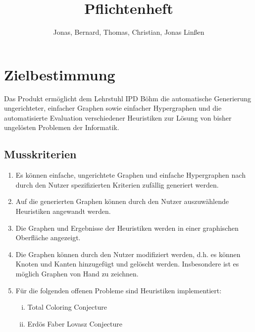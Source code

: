 \documentclass{article}
\title{Pflichtenheft}
\author{Jonas, Bernard, Thomas, Christian, Jonas Linßen}
\begin{document}
	\maketitle
	
	
	\newpage
	
	\tableofcontents
	
	\newpage
	
	
	\section{Zielbestimmung}
	Das Produkt ermöglicht dem Lehrstuhl IPD Böhm die automatische Generierung ungerichteter, einfacher Graphen sowie einfacher Hypergraphen und die automatisierte Evaluation verschiedener Heuristiken zur Lösung von bisher ungelösten Problemen der Informatik.
	
	\subsection{Musskriterien}
	\begin{enumerate}[(M1)]
		\item{Es können einfache, ungerichtete Graphen und einfache Hypergraphen nach durch den Nutzer spezifizierten Kriterien zufällig generiert werden.}
		\item{Auf die generierten Graphen können durch den Nutzer auszuwählende Heuristiken angewandt werden.}
		\item{Die Graphen und Ergebnisse der Heuristiken werden in einer graphischen Oberfläche angezeigt.}
		\item{Die Graphen können durch den Nutzer modifiziert werden, d.h. es können Knoten und Kanten hinzugefügt und gelöscht werden. Insbesondere ist es möglich Graphen von Hand zu zeichnen.}
		\item{Für die folgenden offenen Probleme sind Heuristiken implementiert:
			\begin{enumerate}[i)]
				\item{Total Coloring Conjecture}
				\item{Erdös Faber Lovasz Conjecture}
			\end{enumerate}
		}
	\end{enumerate}
	
\end{document}
